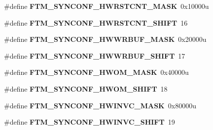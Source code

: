 \begin{DoxyCompactItemize}
\item 
\#define {\bfseries F\+T\+M\+\_\+\+S\+Y\+N\+C\+O\+N\+F\+\_\+\+H\+W\+R\+S\+T\+C\+N\+T\+\_\+\+M\+A\+SK}~0x10000u\hypertarget{group__FTM__Register__Masks_gaea9636cc8049be6d3d952dc343d34185}{}\label{group__FTM__Register__Masks_gaea9636cc8049be6d3d952dc343d34185}

\item 
\#define {\bfseries F\+T\+M\+\_\+\+S\+Y\+N\+C\+O\+N\+F\+\_\+\+H\+W\+R\+S\+T\+C\+N\+T\+\_\+\+S\+H\+I\+FT}~16\hypertarget{group__FTM__Register__Masks_gae0f2be27abcc3ae202f10bb3d27a4dc7}{}\label{group__FTM__Register__Masks_gae0f2be27abcc3ae202f10bb3d27a4dc7}

\item 
\#define {\bfseries F\+T\+M\+\_\+\+S\+Y\+N\+C\+O\+N\+F\+\_\+\+H\+W\+W\+R\+B\+U\+F\+\_\+\+M\+A\+SK}~0x20000u\hypertarget{group__FTM__Register__Masks_ga6191e61768074435e48f3e3d07076d0f}{}\label{group__FTM__Register__Masks_ga6191e61768074435e48f3e3d07076d0f}

\item 
\#define {\bfseries F\+T\+M\+\_\+\+S\+Y\+N\+C\+O\+N\+F\+\_\+\+H\+W\+W\+R\+B\+U\+F\+\_\+\+S\+H\+I\+FT}~17\hypertarget{group__FTM__Register__Masks_gadad6b0aa720155c8c4b689e63a86466a}{}\label{group__FTM__Register__Masks_gadad6b0aa720155c8c4b689e63a86466a}

\item 
\#define {\bfseries F\+T\+M\+\_\+\+S\+Y\+N\+C\+O\+N\+F\+\_\+\+H\+W\+O\+M\+\_\+\+M\+A\+SK}~0x40000u\hypertarget{group__FTM__Register__Masks_gac4c190aeac6b3ca490b9a693350c6ec6}{}\label{group__FTM__Register__Masks_gac4c190aeac6b3ca490b9a693350c6ec6}

\item 
\#define {\bfseries F\+T\+M\+\_\+\+S\+Y\+N\+C\+O\+N\+F\+\_\+\+H\+W\+O\+M\+\_\+\+S\+H\+I\+FT}~18\hypertarget{group__FTM__Register__Masks_ga64d72753d3b6dee9b83125cfba66b52a}{}\label{group__FTM__Register__Masks_ga64d72753d3b6dee9b83125cfba66b52a}

\item 
\#define {\bfseries F\+T\+M\+\_\+\+S\+Y\+N\+C\+O\+N\+F\+\_\+\+H\+W\+I\+N\+V\+C\+\_\+\+M\+A\+SK}~0x80000u\hypertarget{group__FTM__Register__Masks_ga84bc991db330a6933bc0a3b89ed8b85f}{}\label{group__FTM__Register__Masks_ga84bc991db330a6933bc0a3b89ed8b85f}

\item 
\#define {\bfseries F\+T\+M\+\_\+\+S\+Y\+N\+C\+O\+N\+F\+\_\+\+H\+W\+I\+N\+V\+C\+\_\+\+S\+H\+I\+FT}~19\hypertarget{group__FTM__Register__Masks_gae14e244f2072efc59ef7919e4675a988}{}\label{group__FTM__Register__Masks_gae14e244f2072efc59ef7919e4675a988}


\end{DoxyCompactItemize}
